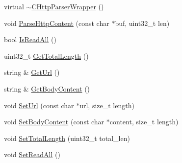 \begin{DoxyCompactItemize}
virtual \hyperlink{class_c_http_parser_wrapper_a859edcf69bb55c5d8a4cbce26cfb53fa}{$\sim$\+C\+Http\+Parser\+Wrapper} ()
\item 
void \hyperlink{class_c_http_parser_wrapper_a163b6568b8f7bbf6e263a8c403407b4f}{Parse\+Http\+Content} (const char $\ast$buf, uint32\+\_\+t len)
\item 
bool \hyperlink{class_c_http_parser_wrapper_a6317df2e1c61752060f4853fed0d8e5b}{Is\+Read\+All} ()
\item 
uint32\+\_\+t \hyperlink{class_c_http_parser_wrapper_a557d7299aef783b0db0ebff11bf7f88c}{Get\+Total\+Length} ()
\item 
string \& \hyperlink{class_c_http_parser_wrapper_a15d7a1b685c3b0a13a4fbd033bb37b96}{Get\+Url} ()
\item 
string \& \hyperlink{class_c_http_parser_wrapper_aac4b2aee55f2d29e85b858da7b227402}{Get\+Body\+Content} ()
\item 
void \hyperlink{class_c_http_parser_wrapper_a2601a18c62f8f7dfbc88a555f625d765}{Set\+Url} (const char $\ast$url, size\+\_\+t length)
\item 
void \hyperlink{class_c_http_parser_wrapper_ac9ca2f62addee35a489e671ca72dc558}{Set\+Body\+Content} (const char $\ast$content, size\+\_\+t length)
\item 
void \hyperlink{class_c_http_parser_wrapper_af3c58761ba5106e516767256393a2ccc}{Set\+Total\+Length} (uint32\+\_\+t total\+\_\+len)
\item 
void \hyperlink{class_c_http_parser_wrapper_a915fd9ee3c6e5c6f77289c11d3d515a2}{Set\+Read\+All} ()
\end{DoxyCompactItemize}
